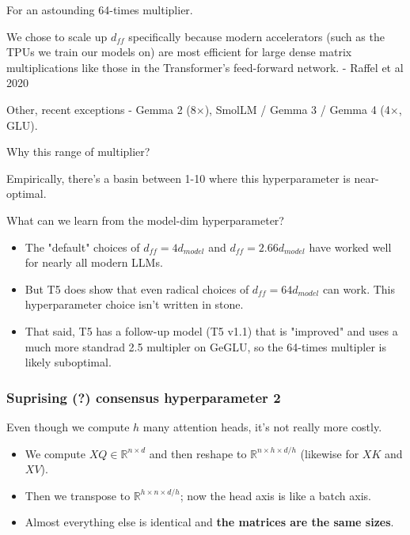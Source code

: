 \documentclass[12pt,twoside]{article}
\begin{document}
For an astounding 64-times multiplier. 

\begin{center}
    We chose to scale up \(d_{ff}\) specifically because modern accelerators (such as the TPUs we train our models on) are most efficient for large dense matrix multiplications like those in the Transformer's feed-forward network. - Raffel et al 2020
\end{center}

Other, recent exceptions - Gemma 2 (8\(\times\)), SmolLM / Gemma 3 / Gemma 4 (4\(\times\), GLU).

\begin{question}
    Why this range of multiplier?
\end{question}

Empirically, there's a basin between 1-10 where this hyperparameter is near-optimal.

\begin{question}
    What can we learn from the model-dim hyperparameter?
\end{question}

\begin{itemize}
    \item The "default" choices of \(d_{ff} = 4d_{model}\) and \(d_{ff} = 2.66d_{model}\) have worked well for nearly all modern LLMs.
    \item But T5 does show that even radical choices of \(d_{ff} = 64 d_{model}\) can work. This hyperparameter choice isn't written in stone. 
    \item That said, T5 has a follow-up model (T5 v1.1) that is "improved" and uses a much more standrad 2.5 multipler on GeGLU, so the 64-times multipler is likely suboptimal.
\end{itemize}

\subsubsection*{Suprising (?) consensus hyperparameter 2}

Even though we compute \(h\) many attention heads, it's not really more costly.

\begin{itemize}
    \item We compute \(XQ \in \mathbb{R}^{n \times d}\) and then reshape to \(\mathbb{R}^{n \times h \times d / h}\) (likewise for \(XK\) and \(XV\)).
    \item Then we transpose to \(\mathbb{R}^{h \times n \times d / h}\); now the head axis is like a batch axis.
    \item Almost everything else is identical and \textbf{the matrices are the same sizes}.  
\end{itemize}
\end{document}
